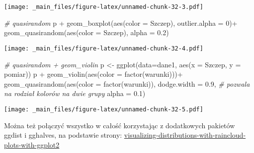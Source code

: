 \documentclass[
]{book}
\newenvironment{Shaded}{\begin{snugshade}}{\end{snugshade}}
\newcommand{\AttributeTok}[1]{\textcolor[rgb]{0.77,0.63,0.00}{#1}}
\newcommand{\CommentTok}[1]{\textcolor[rgb]{0.56,0.35,0.01}{\textit{#1}}}
\newcommand{\DecValTok}[1]{\textcolor[rgb]{0.00,0.00,0.81}{#1}}
\newcommand{\FloatTok}[1]{\textcolor[rgb]{0.00,0.00,0.81}{#1}}
\newcommand{\FunctionTok}[1]{\textcolor[rgb]{0.00,0.00,0.00}{#1}}
\newcommand{\NormalTok}[1]{#1}
\newcommand{\OtherTok}[1]{\textcolor[rgb]{0.56,0.35,0.01}{#1}}
\newcommand{\SpecialCharTok}[1]{\textcolor[rgb]{0.00,0.00,0.00}{#1}}
\begin{document}
\texttt{[image: \_main\_files/figure-latex/unnamed-chunk-32-3.pdf]}

\begin{Shaded}
\begin{Highlighting}[]
\CommentTok{\# quasirandom}
\NormalTok{p }\SpecialCharTok{+} \FunctionTok{geom\_boxplot}\NormalTok{(}\FunctionTok{aes}\NormalTok{(}\AttributeTok{color =}\NormalTok{ Szczep), }\AttributeTok{outlier.alpha =} \DecValTok{0}\NormalTok{)}\SpecialCharTok{+}
  \FunctionTok{geom\_quasirandom}\NormalTok{(}\FunctionTok{aes}\NormalTok{(}\AttributeTok{color =}\NormalTok{ Szczep), }\AttributeTok{alpha =} \FloatTok{0.2}\NormalTok{)}
\end{Highlighting}
\end{Shaded}

\texttt{[image: \_main\_files/figure-latex/unnamed-chunk-32-4.pdf]}

\begin{Shaded}
\begin{Highlighting}[]
\CommentTok{\# quasirandom + geom\_violin}
\NormalTok{p }\OtherTok{\textless{}{-}} \FunctionTok{ggplot}\NormalTok{(}\AttributeTok{data=}\NormalTok{dane1, }\FunctionTok{aes}\NormalTok{(}\AttributeTok{x =}\NormalTok{ Szczep, }\AttributeTok{y =}\NormalTok{ pomiar))}
\NormalTok{p }\SpecialCharTok{+} \FunctionTok{geom\_violin}\NormalTok{(}\FunctionTok{aes}\NormalTok{(}\AttributeTok{color =} \FunctionTok{factor}\NormalTok{(warunki)))}\SpecialCharTok{+}
  \FunctionTok{geom\_quasirandom}\NormalTok{(}\FunctionTok{aes}\NormalTok{(}\AttributeTok{color =} \FunctionTok{factor}\NormalTok{(warunki)), }
                   \AttributeTok{dodge.width =} \FloatTok{0.9}\NormalTok{, }\CommentTok{\# pozwala na rodział kolorów na dwie grupy}
                   \AttributeTok{alpha =} \FloatTok{0.1}\NormalTok{)}
\end{Highlighting}
\end{Shaded}

\texttt{[image: \_main\_files/figure-latex/unnamed-chunk-32-5.pdf]}

Można też połączyć wszystko w całość korzystając z dodatkowych pakietów ggdist i gghalves, na podstawie strony: \href{https://www.cedricscherer.com/2021/06/06/visualizing-distributions-with-raincloud-plots-with-ggplot2/}{visualizing-distributions-with-raincloud-plots-with-ggplot2}
\end{document}
